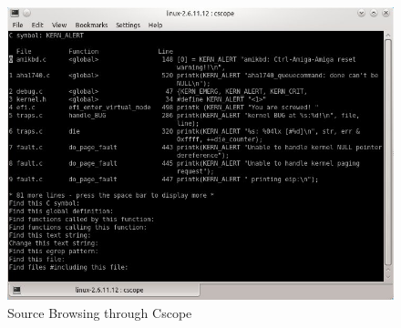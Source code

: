 \begin{figure}[ht]
	\centering
	\includegraphics[scale=0.5]{images/cscope.png}
	\caption{Source Browsing through Cscope}
\end{figure}

